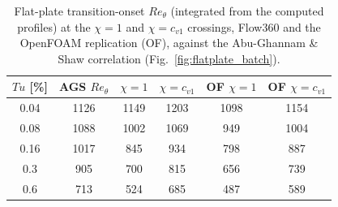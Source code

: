 \begin{table}[tp]
  \centering\small
  \caption{Flat-plate transition-onset $Re_\theta$ (integrated from the computed profiles) at the $\chi\!=\!1$ and $\chi\!=\!c_{v1}$ crossings, Flow360 and the OpenFOAM replication (OF), against the Abu-Ghannam \& Shaw correlation (Fig.~\ref{fig:flatplate_batch}).}
  \label{tab:data_flatplate}
  \begin{tabular}{cccccc}
    \toprule
    $Tu$ [\%] & AGS $Re_\theta$ & $\chi\!=\!1$ & $\chi\!=\!c_{v1}$ & OF $\chi\!=\!1$ & OF $\chi\!=\!c_{v1}$ \\
    \midrule
    0.04 & 1126 & 1149 & 1203 & 1098 & 1154 \\
    0.08 & 1088 & 1002 & 1069 & 949 & 1004 \\
    0.16 & 1017 & 845 & 934 & 798 & 887 \\
    0.3 & 905 & 700 & 815 & 656 & 739 \\
    0.6 & 713 & 524 & 685 & 487 & 589 \\
    \bottomrule
  \end{tabular}
\end{table}
